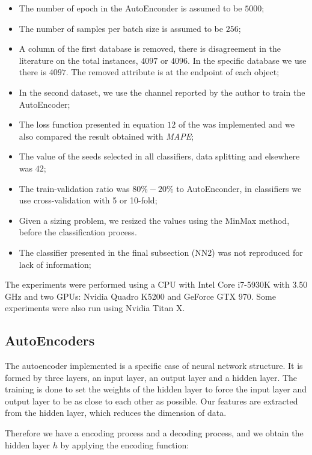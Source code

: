 \begin{itemize}
\item The number of epoch in the AutoEnconder is assumed to be $5000$; 
\item The number of samples per batch size is assumed to be $256$; 
\item A column of the first database is removed, there is disagreement in the literature on the total instances, $4097$ or $4096$. In the specific database we use there is $4097$. The removed attribute is at the endpoint of each object; 
\item In the second dataset, we use the channel reported by the author to train the AutoEncoder;
\item The loss function presented in equation $12$ of the \cite{WenZha:2018} was implemented and we also compared the result obtained with \textit{MAPE}; 
\item The value of the seeds selected in all classifiers, data splitting and elsewhere was $42$; 
\item The train-validation ratio was $80\%-20\%$ to AutoEnconder, in classifiers we use cross-validation with 5 or 10-fold; 
\item Given a sizing problem, we resized the values using the MinMax method, before the classification process.
\item The classifier presented in the final subsection (NN2) was not reproduced for lack of information; 
\end{itemize}

The experiments were performed using a CPU with Intel Core i7-5930K with 3.50 GHz and two GPUs: Nvidia Quadro K5200 and GeForce GTX 970. Some experiments were also run using Nvidia Titan X.

\subsection{AutoEncoders}

The autoencoder implemented is a specific case of neural network structure. It is formed by three layers, an input layer, an output layer and a hidden layer. The training is done to set the weights of the hidden layer to force the input layer and output layer to be as close to each other as possible. Our features are extracted from the hidden layer, which reduces the dimension of data. 

Therefore we have a encoding process and a decoding process, and we obtain the hidden layer $h$ by applying the encoding function:

